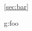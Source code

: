 \documentclass{article}
\begin{document}

% 

\ref{sec:bar}

\gls{g:foo}


\printglossaries
\end{document}
